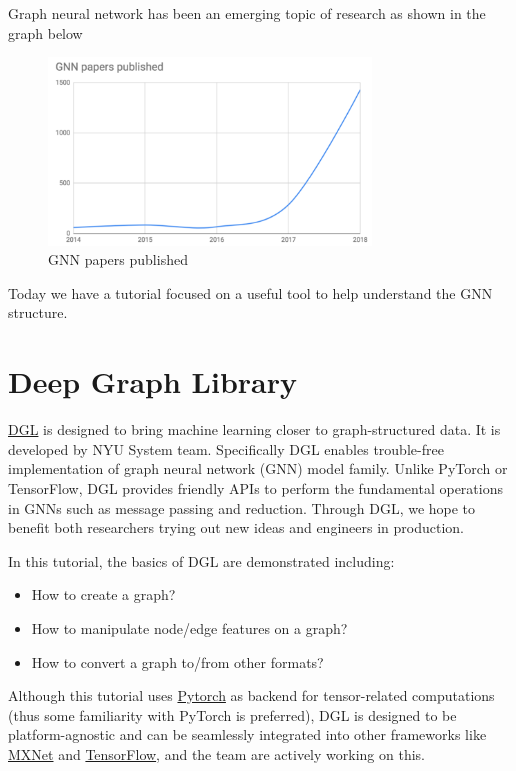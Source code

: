 Graph neural network has been an emerging topic of research as shown in the graph below

\begin{figure}[ht]
\begin{center}
  \includegraphics[width=3.38in]{images/GNN Papers Published.png}
\end{center}
   \caption{GNN papers published}
\label{fig:CV}
\end{figure}

Today we have a tutorial focused on a useful tool to help understand the GNN structure.

\section{Deep Graph Library}
\href{www.dgl.ai}{DGL} is designed to bring machine learning closer to graph-structured data. It is developed by NYU System team. Specifically DGL enables trouble-free implementation of graph neural network (GNN) model family. Unlike PyTorch or TensorFlow, DGL provides friendly APIs to perform the fundamental operations in GNNs such as message passing and reduction. Through DGL, we hope to benefit both researchers trying out new ideas and engineers in production.

In this tutorial, the basics of DGL are demonstrated including:
\begin{itemize}
\item How to create a graph?
\item How to manipulate node/edge features on a graph?
\item How to convert a graph to/from other formats?
\end{itemize}

Although this tutorial uses \href{https://pytorch.org}{Pytorch} as backend for tensor-related computations (thus some familiarity with PyTorch is preferred), DGL is designed to be platform-agnostic and can be seamlessly integrated into other frameworks like \href{https://mxnet.apache.org/}{MXNet} and \href{https://www.tensorflow.org/}{TensorFlow}, and the team are actively working on this.


